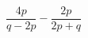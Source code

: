 \begin{ex}[type=expressions]
	\begin{condition}
		\( \dfrac{4p}{q-2p}-\dfrac{2p}{2p+q} \)
	\end{condition}
\end{ex}
